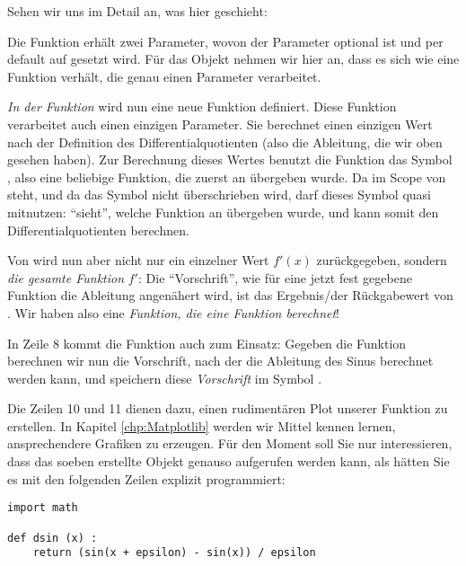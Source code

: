 Sehen wir uns im Detail an, was hier geschieht:

Die Funktion  erhält zwei Parameter, wovon der Parameter  optional ist und per default auf  gesetzt wird. Für das Objekt  nehmen wir hier an, dass es sich wie eine Funktion verhält, die genau einen Parameter verarbeitet.

\emph{In der Funktion}  wird nun eine neue Funktion  definiert. Diese Funktion verarbeitet auch einen einzigen Parameter. Sie berechnet einen einzigen Wert nach der Definition des Differentialquotienten (also die Ableitung, die wir oben gesehen haben). Zur Berechnung dieses Wertes benutzt die Funktion  das Symbol , also eine beliebige Funktion, die zuerst an  übergeben wurde. Da  im Scope von  steht, und da das Symbol  nicht überschrieben wird, darf  dieses Symbol quasi mitnutzen:  \enquote{sieht}, welche Funktion an  übergeben wurde, und kann somit den Differentialquotienten berechnen.

Von  wird nun aber nicht nur ein einzelner Wert $f'(x)$ zurückgegeben, sondern \emph{die gesamte Funktion} $f'$: Die \enquote{Vorschrift}, wie für eine jetzt fest gegebene Funktion  die Ableitung angenähert wird, ist das Ergebnis/der Rückgabewert von . Wir haben also eine \emph{Funktion, die eine Funktion berechnet}!

In Zeile 8 kommt die Funktion  auch zum Einsatz: Gegeben die Funktion  berechnen wir nun die Vorschrift, nach der die Ableitung des Sinus berechnet werden kann, und speichern diese \emph{Vorschrift} im Symbol .

Die Zeilen 10 und 11 dienen dazu, einen rudimentären Plot unserer Funktion zu erstellen. In Kapitel \ref{chp:Matplotlib} werden wir Mittel kennen lernen, ansprechendere Grafiken zu erzeugen. Für den Moment soll Sie nur interessieren, dass das soeben erstellte Objekt  genauso aufgerufen werden kann, als hätten Sie es mit den folgenden Zeilen explizit programmiert:

\begin{codebox}
\begin{verbatim}
import math

def dsin (x) :
    return (sin(x + epsilon) - sin(x)) / epsilon
\end{verbatim}
\end{codebox}

